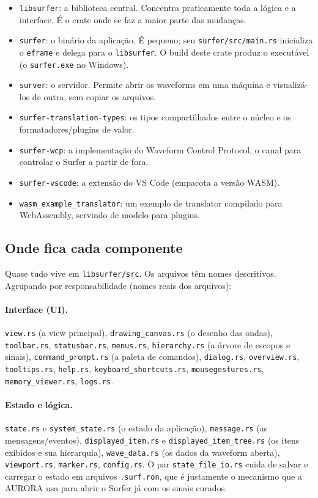 \documentclass[11pt,a4paper]{article}
\begin{document}
\begin{itemize}
  \item \texttt{libsurfer}: a biblioteca central. Concentra praticamente toda a
        lógica e a interface. É o crate onde se faz a maior parte das mudanças.
  \item \texttt{surfer}: o binário da aplicação. É pequeno; seu
        \texttt{surfer/src/main.rs} inicializa o \texttt{eframe} e delega para o
        \texttt{libsurfer}. O build deste crate produz o executável (o
        \texttt{surfer.exe} no Windows).
  \item \texttt{surver}: o servidor. Permite abrir os waveforms em uma máquina e
        visualizá-los de outra, sem copiar os arquivos.
  \item \texttt{surfer-translation-types}: os tipos compartilhados entre o núcleo
        e os formatadores/plugins de valor.
  \item \texttt{surfer-wcp}: a implementação do Waveform Control Protocol, o
        canal para controlar o Surfer a partir de fora.
  \item \texttt{surfer-vscode}: a extensão do VS Code (empacota a versão WASM).
  \item \texttt{wasm\_example\_translator}: um exemplo de translator compilado
        para WebAssembly, servindo de modelo para plugins.
\end{itemize}

\subsection{Onde fica cada componente}

Quase tudo vive em \texttt{libsurfer/src}. Os arquivos têm nomes descritivos.
Agrupando por responsabilidade (nomes reais dos arquivos):

\paragraph{Interface (UI).}
\texttt{view.rs} (a view principal), \texttt{drawing\_canvas.rs} (o desenho das
ondas), \texttt{toolbar.rs}, \texttt{statusbar.rs}, \texttt{menus.rs},
\texttt{hierarchy.rs} (a árvore de escopos e sinais), \texttt{command\_prompt.rs}
(a paleta de comandos), \texttt{dialog.rs}, \texttt{overview.rs},
\texttt{tooltips.rs}, \texttt{help.rs}, \texttt{keyboard\_shortcuts.rs},
\texttt{mousegestures.rs}, \texttt{memory\_viewer.rs}, \texttt{logs.rs}.

\paragraph{Estado e lógica.}
\texttt{state.rs} e \texttt{system\_state.rs} (o estado da aplicação),
\texttt{message.rs} (as mensagens/eventos), \texttt{displayed\_item.rs} e
\texttt{displayed\_item\_tree.rs} (os itens exibidos e sua hierarquia),
\texttt{wave\_data.rs} (os dados da waveform aberta), \texttt{viewport.rs},
\texttt{marker.rs}, \texttt{config.rs}. O par \texttt{state\_file\_io.rs} cuida de
salvar e carregar o estado em arquivos \texttt{.surf.ron}, que é justamente o
mecanismo que a AURORA usa para abrir o Surfer já com os sinais curados.
\end{document}
